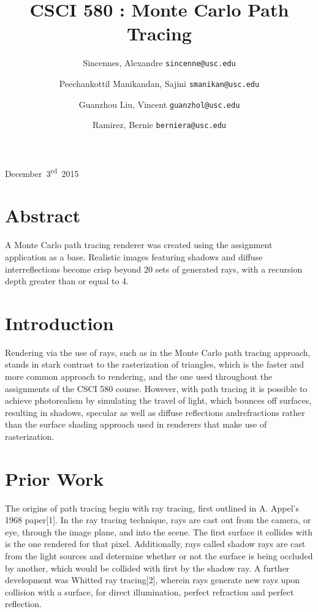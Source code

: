 \documentclass[journal]{IEEEtran}
\begin{document}
\title{CSCI 580 : Monte Carlo Path Tracing}
{December~3\textsuperscript{rd}~2015}
\author{
	Sincennes, Alexandre
	\texttt{sincenne@usc.edu}\\
	\and
 	Peechankottil Manikandan, Sajini
 	\texttt{smanikan@usc.edu}\\
  	\and
	Guanzhou Liu, Vincent
 	\texttt{guanzhol@usc.edu}\\
  	\and
	Ramirez, Bernie
 	\texttt{berniera@usc.edu}\\
  
}
\maketitle


\section{Abstract}
A Monte Carlo path tracing renderer was created using the assignment application as a base. Realistic images featuring shadows and diffuse interreflections become crisp beyond 20 sets of generated rays, with a recursion depth greater than or equal to 4.


\section{Introduction}
Rendering via the use of rays, such as in the Monte Carlo path tracing approach, stands in stark contrast to the rasterization of triangles, which is the faster and more common approach to rendering, and the one used throughout the assignments of the CSCI 580 course. However, with path tracing it is possible to achieve photorealism by simulating the travel of light, which bounces off surfaces, resulting in shadows, specular as well as diffuse reflections andrefractions rather than the surface shading approach used in renderers that make use of rasterization.


\section{Prior Work}
The origins of path tracing begin with ray tracing, first outlined in A. Appel's 1968 paper[1]. In the ray tracing technique, rays are cast out from the camera, or eye, through the image plane, and into the scene. The first surface it collides with is the one rendered for that pixel. Additionally, rays called shadow rays are cast from the light sources and determine whether or not the surface is being occluded by another, which would be collided with first by the shadow ray. A further development was Whitted ray tracing[2], wherein rays generate new rays upon collision with a surface, for direct illumination, perfect refraction and perfect reflection.
\end{document}
